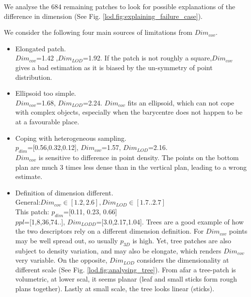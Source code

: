 		
		
		
		We analyse the 684 remaining patches to look for possible explanations of the difference in dimension (See Fig. \ref{lod.fig:explaining_failure_case}).
		
		We consider the following four main sources of limitations from $Dim_{cov}$.
		\begin{itemize}%
			\label{lod.result.dim_failure}
			\item Elongated patch.\\
				$Dim_{cov}$=1.42
				,$Dim_{LOD}$=1.92. 
				If the patch is not roughly a square,$Dim_{cov}$ gives a bad estimation as it is biased by the un-symmetry of point distribution.
			\item Ellipsoid too simple.\\
				$Dim_{cov}$=1.68,
				$Dim_{LOD}$=2.24.
				$Dim_{cov}$ fits an ellipsoid, which can not cope with complex objects, especially when the barycentre does not happen to be at a favourable place. 
			\item Coping with heterogeneous sampling.\\
				$p_{dim}$=[0.56,0.32,0.12],
				$Dim_{cov}$=1.57,
				$Dim_{LOD}$=2.16.\\
				$Dim_{cov}$ is sensitive to difference in point density. The points on the bottom plan are much 3 times less dense than in the vertical plan, leading to a wrong estimate.
			\item Definition of dimension different.\\
				General:$Dim_{cov}\in[1.2,2.6],Dim_{LOD}\in[1.7..2.7]$\\
				This patch: $p_{dim}$=[0.11, 0.23, 0.66]\\
				$ppl$=[1,8,36,74..],
				$Dim_{LODD}$=[3.0,2.17,1.04].
				Trees are a good example of how the two descriptors rely on a different dimension definition. For $Dim_{cov}$ points may be well spread out, so usually $p_{3D}$ is high.
				Yet, tree patches are also subject to density variation, and may also be elongate, which renders $Dim_{cov}$ very variable.
				On the opposite, $Dim_{LOD}$ considers the dimensionality at different scale (See Fig. \ref{lod.fig:analysing_tree}). From afar a tree-patch is volumetric, at lower scal, it seems planar (leaf and small sticks form rough plans together). Lastly at small scale, the tree looks linear (sticks). 
		\end{itemize}
		 
